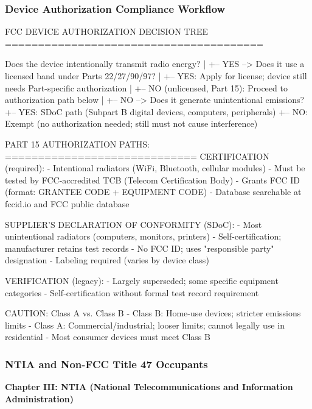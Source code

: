 \documentclass[11pt,letterpaper]{article}
\begin{document}
\subsubsection{Device Authorization Compliance Workflow}

\begin{asciibox}
FCC DEVICE AUTHORIZATION DECISION TREE
=======================================

Does the device intentionally transmit radio energy?
|
+-- YES --> Does it use a licensed band under Parts 22/27/90/97?
|               +-- YES: Apply for license; device still needs Part-specific authorization
|               +-- NO (unlicensed, Part 15): Proceed to authorization path below
|
+-- NO  --> Does it generate unintentional emissions?
                +-- YES: SDoC path (Subpart B digital devices, computers, peripherals)
                +-- NO: Exempt (no authorization needed; still must not cause interference)

PART 15 AUTHORIZATION PATHS:
=============================
CERTIFICATION (required):
  - Intentional radiators (WiFi, Bluetooth, cellular modules)
  - Must be tested by FCC-accredited TCB (Telecom Certification Body)
  - Grants FCC ID (format: GRANTEE CODE + EQUIPMENT CODE)
  - Database searchable at fccid.io and FCC public database

SUPPLIER'S DECLARATION OF CONFORMITY (SDoC):
  - Most unintentional radiators (computers, monitors, printers)
  - Self-certification; manufacturer retains test records
  - No FCC ID; uses "responsible party" designation
  - Labeling required (varies by device class)

VERIFICATION (legacy):
  - Largely superseded; some specific equipment categories
  - Self-certification without formal test record requirement

CAUTION: Class A vs. Class B
  - Class B: Home-use devices; stricter emissions limits
  - Class A: Commercial/industrial; looser limits; cannot legally use in residential
  - Most consumer devices must meet Class B
\end{asciibox}

\subsubsection{NTIA and Non-FCC Title 47 Occupants}

\textbf{Chapter III: NTIA (National Telecommunications and Information Administration)}
\end{document}
